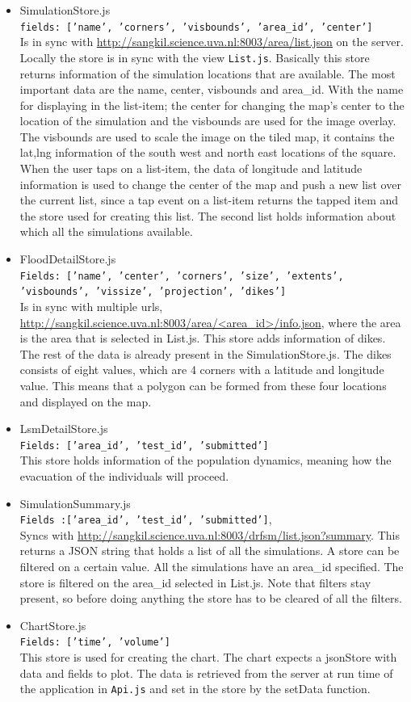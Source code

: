 \begin{itemize}
\item SimulationStore.js \\
\texttt{fields: ['name', 'corners', 'visbounds', 'area\_id', 'center']} \\
Is in sync with \url{http://sangkil.science.uva.nl:8003/area/list.json} on the server. Locally the store is in sync with the view \texttt{List.js}. Basically this store returns information of the simulation locations that are available. The most important data are the name, center, visbounds and area\_id. With the name for displaying in the list-item; the center for changing the map's center to the location of the simulation and the visbounds are used for the image overlay. The visbounds are used to scale the image on the tiled map, it contains the lat,lng information of the south west and north east locations of the square. When the user taps on a list-item, the data of longitude and latitude information is used to change the center of the map and push a new list over the current list, since a tap event on a list-item returns the tapped item and the store used for creating this list. The second list holds information about which all the simulations available.
\item FloodDetailStore.js \\
\texttt{Fields: ['name', 'center', 'corners', 'size', 'extents', 'visbounds', 'vissize', 'projection', 'dikes']} \\
Is in sync with multiple urls, \url{http://sangkil.science.uva.nl:8003/area/<area\_id>/info.json}, where the area is the area that is selected in List.js. This store adds information of dikes. The rest of the data is already present in the SimulationStore.js. The dikes consists of eight values, which are 4 corners with a latitude and longitude value. This means that a polygon can be formed from these four locations and displayed on the map.
\item LsmDetailStore.js \\
\texttt{Fields: ['area\_id', 'test\_id', 'submitted']} \\
This store holds information of the population dynamics, meaning how the evacuation of the individuals will proceed. 
\item SimulationSummary.js \\
\texttt{Fields :['area\_id', 'test\_id', 'submitted']},\\
Syncs with \url{http://sangkil.science.uva.nl:8003/drfsm/list.json?summary}. This returns a JSON string that holds a list of all the simulations. A store can be filtered on a certain value. All the simulations have an area\_id specified. The store is filtered on the area\_id selected in List.js. Note that filters stay present, so before doing anything the store has to be cleared of all the filters.
\item ChartStore.js \\
\texttt{Fields: ['time', 'volume']}\\
This store is used for creating the chart. The chart expects a jsonStore with data and fields to plot. The data is retrieved from the server at run time of the application in \texttt{Api.js} and set in the store by the setData function.
\end{itemize}
